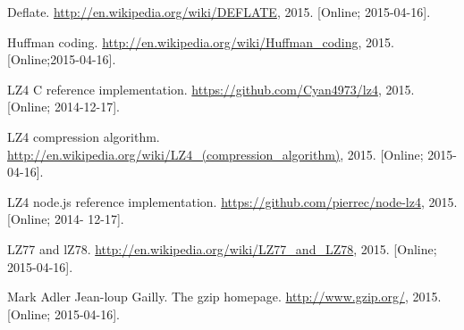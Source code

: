 \documentclass[11pt]{article}
\begin{document}
\begin{thebibliography}{1}

   Deflate. \url{http://en.wikipedia.org/wiki/DEFLATE}, 2015. [Online; 2015-04-16].
  
   Huffman coding. \url{http://en.wikipedia.org/wiki/Huffman_coding}, 2015.[Online;2015-04-16].
  
   LZ4 C reference implementation. \url{https://github.com/Cyan4973/lz4}, 2015. [Online; 2014-12-17].

   LZ4 compression algorithm. \url{http://en.wikipedia.org/wiki/LZ4_(compression_algorithm)}, 2015. [Online; 2015-04-16].
  
   LZ4 node.js reference implementation. \url{https://github.com/pierrec/node-lz4}, 2015. [Online; 2014-
12-17].

   LZ77 and lZ78. \url{http://en.wikipedia.org/wiki/LZ77_and_LZ78}, 2015.
[Online; 2015-04-16].

   Mark Adler Jean-loup Gailly. The gzip homepage. \url{http://www.gzip.org/},
2015. [Online; 2015-04-16].

\end{thebibliography}
\end{document}
